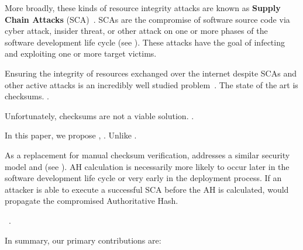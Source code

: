 





More broadly, these kinds of resource integrity attacks are known as
\textbf{Supply Chain Attacks} (SCA)~\cite{}. SCAs are the compromise of software
source code via cyber attack, insider threat, or other attack on one or more
phases of the software development life cycle (see ). These
attacks have the goal of infecting and exploiting one or more target victims.

Ensuring the integrity of resources exchanged over the internet despite SCAs and
other active attacks is an incredibly well studied problem~\cite{MD5Header,
HTTP1.1, HTTPS, SRI, LF, OpenPGP1, DNSSEC}. The state of the art is checksums.
.

Unfortunately, checksums are not a viable solution. .

In this paper, we propose \SYSTEM{}, . Unlike .

As a replacement for manual checksum verification, \SYSTEM{} addresses a similar
security model and   (see ). AH calculation is necessarily more
likely to occur later in the software development life cycle or very early in
the deployment process. If an attacker is able to execute a successful SCA
before the AH is calculated, \SYSTEM{} would propagate the compromised
Authoritative Hash.

~\cite{DNSSEC}.


In summary, our primary contributions are:

